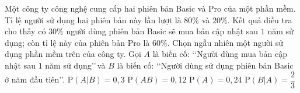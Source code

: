\begin{ex}%
	Một công ty công nghệ cung  cấp hai phiên bản Basic và Pro của một phần mềm. Tỉ lệ người sử dụng hai phiên bản này lần lượt là $80\%$ và $20\%$. Kết quả điều tra cho thấy có $30\%$ người dùng
	phiên bản  Basic sẽ mua bản cập nhật sau $1$ năm sử dụng; còn tỉ lệ này của phiên bản Pro là $60\%$.
	Chọn ngẫu nhiên  một người sử dụng phần mềm trên của công ty.
	Gọi $A$ là biến cố: \lq\lq Người dùng mua bản cập nhật sau $1$  năm sử dụng\rq\rq\,và $B$ là biến cố: \lq\lq Người dùng
	sử dụng phiên bản  Basic ở năm đầu tiên\rq\rq.
	\choiceTF 
		 {\True $\mathrm{P}(A|B)=0{,}3 $}
		{$\mathrm{P}(AB)=0{,}12$} 
		{$\mathrm{P}(A)=0{,}24  $}
		{\True $\mathrm{P}(B|A)=\dfrac{2}{3}  $}
\end{ex}

